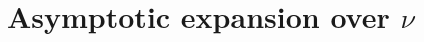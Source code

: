 \documentclass[10pt]{article}
\numberwithin{equation}{section}
\begin{document}
\section{Asymptotic expansion over $\nu$ }

\end{document}
